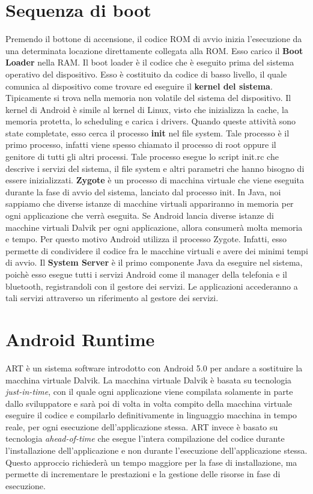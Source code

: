 \documentclass[12pt]{report}
\begin{document}
\section{Sequenza di boot}
Premendo il bottone di accensione, il codice ROM di avvio inizia l'esecuzione da una determinata locazione direttamente collegata alla ROM. Esso carico il \textbf{Boot Loader} nella RAM. Il boot loader è il codice che è eseguito prima del sistema operativo del dispositivo. Esso è costituito da codice di basso livello, il quale comunica al dispositivo come trovare ed eseguire il \textbf{kernel del sistema}. Tipicamente si trova nella memoria non volatile del sistema del dispositivo. Il kernel di Android è simile al kernel di Linux, visto che inizializza la cache, la memoria protetta, lo scheduling e carica i drivers. Quando queste attività sono state completate, esso cerca il processo \textbf{init} nel file system. Tale processo è il primo processo, infatti viene spesso chiamato il processo di root oppure il genitore di tutti gli altri processi. Tale processo esegue lo script init.rc che descrive i servizi del sistema, il file system e altri parametri che hanno bisogno di essere inizializzati. \textbf{Zygote} è un processo di macchina virtuale che viene eseguita durante la fase di avvio del sistema, lanciato dal processo init. In Java, noi sappiamo che diverse istanze di macchine virtuali appariranno in memoria per ogni applicazione che verrà eseguita. Se Android lancia diverse istanze di macchine virtuali Dalvik per ogni applicazione, allora consumerà molta memoria e tempo. Per questo motivo Android utilizza il processo Zygote. Infatti, esso permette di condividere il codice fra le macchine virtuali e avere dei minimi tempi di avvio. Il \textbf{System Server} è il primo componente Java da eseguire nel sistema, poichè esso esegue tutti i servizi Android come il manager della telefonia e il bluetooth, registrandoli con il gestore dei servizi. Le applicazioni accederanno a tali servizi attraverso un riferimento al gestore dei servizi.
\section{Android Runtime}
ART è un sistema software introdotto con Android 5.0 per andare a sostituire la macchina virtuale Dalvik. La macchina virtuale Dalvik è basata su tecnologia \textit{just-in-time}, con il quale ogni applicazione viene compilata solamente in parte dallo sviluppatore e sarà poi di volta in volta compito della macchina virtuale eseguire il codice e compilarlo definitivamente in linguaggio macchina in tempo reale, per ogni esecuzione dell'applicazione stessa. ART invece è basato su tecnologia \textit{ahead-of-time} che esegue l'intera compilazione del codice durante l'installazione dell'applicazione e non durante l'esecuzione dell'applicazione stessa. Questo approccio richiederà un tempo maggiore per la fase di installazione, ma permette di incrementare le prestazioni e la gestione delle risorse in fase di esecuzione.
\end{document}
